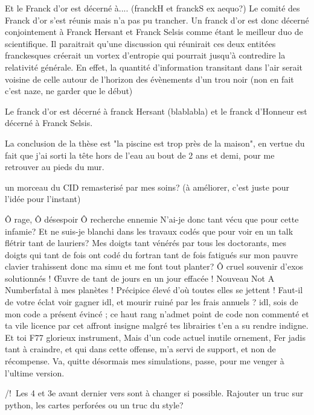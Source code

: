 Et le Franck d'or est décerné à.... (franckH et franckS ex aequo?)
Le comité des Franck d'or s'est réunis mais n'a pas pu trancher. Un franck d'or est donc décerné conjointement à Franck Hersant et Franck Selsis comme étant le meilleur duo de scientifique. Il paraitrait qu'une discussion qui réunirait ces deux entitées franckesques créerait un vortex d'entropie qui pourrait jusqu'à contredire la relativité générale. En effet, la quantité d'information transitant dans l'air serait voisine de celle autour de l'horizon des évènements d'un trou noir (non en fait c'est naze, ne garder que le début)

Le franck d'or est décerné à franck Hersant (blablabla) et le franck d'Honneur est décerné à Franck Selsis.

La conclusion de la thèse est "la piscine est trop près de la maison", en vertue du fait que j'ai sorti la tête hors de l'eau au bout de 2 ans et demi, pour me retrouver au pieds du mur.

un morceau du CID remasterisé par mes soins? (à améliorer, c'est juste pour l'idée pour l'instant)


Ô rage, Ô désespoir Ô recherche ennemie
N'ai-je donc tant vécu que pour cette infamie?
Et ne suis-je blanchi dans les travaux codés
que pour voir en un talk flétrir tant de lauriers? 
Mes doigts tant vénérés par tous les doctorants, 
mes doigts qui tant de fois ont codé du fortran
tant de fois fatigués sur mon pauvre clavier
trahissent donc ma simu et me font tout planter? 
Ô cruel souvenir d'exos solutionnés !
Œuvre de tant de jours en un jour effacée !
Nouveau \og Not A Number\fg fatal à mes planètes !
Précipice élevé d'où toutes elles se jettent !
Faut-il de votre éclat voir gagner idl, 
et mourir ruiné par les frais annuels ? 
idl, sois de mon code a présent évincé ; 
ce haut rang n'admet point de code non commenté
et ta vile licence par cet affront insigne
malgré tes librairies t'en a su rendre indigne. 
Et toi F77 glorieux instrument, 
Mais d'un code actuel inutile ornement, 
Fer jadis tant à craindre, et qui dans cette offense, 
m'a servi de support, et non de récompense. 
Va, quitte désormais mes simulations,
passe, pour me venger à l'ultime version.

/!\ Les 4 et 3e avant dernier vers sont à changer si possible. Rajouter un truc sur python, les cartes perforées ou un truc du style?